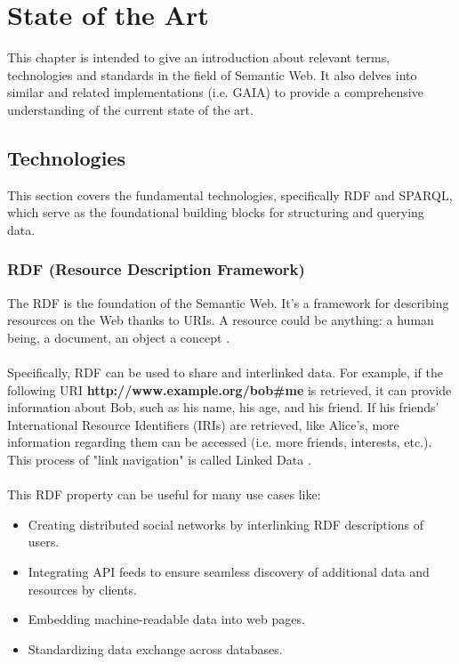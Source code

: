 \chapter{State of the Art\label{cha:chapter2}}

This chapter is intended to give an introduction about relevant terms, technologies and standards in the field of Semantic Web. It also delves into similar and related implementations (i.e. GAIA) to provide a comprehensive understanding of the current state of the art.

\section{Technologies \label{sec:tech}}

This section covers the fundamental technologies, specifically RDF and SPARQL, which serve as the foundational building blocks for structuring and querying data.

\subsection{RDF (Resource Description Framework)\label{sec:rdf_primer}}

The RDF is the foundation of the Semantic Web. It's a framework for describing resources on the Web thanks to URIs. A resource could be anything: a human being, a document, an object a concept \cite{rdf}. 
\\
\\
Specifically, RDF can be used to share and interlinked data. For example, if the following URI \space \textbf{http://www.example.org/bob\#me} is retrieved, it can provide information about Bob, such as his name, his age, and his friend.
If his friends' International Resource Identifiers (IRIs) are retrieved, like Alice's, more information regarding them can be accessed (i.e. more friends, interests, etc.). This process of "link navigation" is called Linked Data \cite{rdf}.
\\
\\
This RDF property can be useful for many use cases like: 
\begin{itemize}
	\item Creating distributed social networks by interlinking RDF descriptions of users.
	\item Integrating API feeds to ensure seamless discovery of additional data and resources by clients.
	\item Embedding machine-readable data into web pages.
	\item Standardizing data exchange across databases.
\end{itemize}

